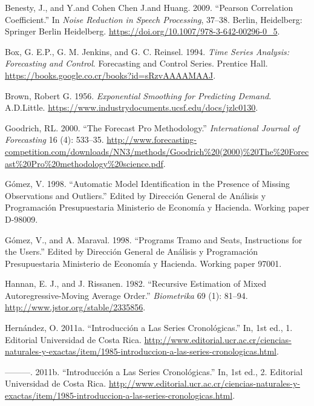 \documentclass[]{article}
\begin{document}
\leavevmode\hypertarget{ref-pearson}{}%
Benesty, J., and Y.and Cohen Chen J.and Huang. 2009. ``Pearson
Correlation Coefficient.'' In \emph{Noise Reduction in Speech
Processing}, 37--38. Berlin, Heidelberg: Springer Berlin Heidelberg.
\url{https://doi.org/10.1007/978-3-642-00296-0_5}.

\leavevmode\hypertarget{ref-box-jenkins}{}%
Box, G. E.P., G. M. Jenkins, and G. C. Reinsel. 1994. \emph{Time Series
Analysis: Forecasting and Control}. Forecasting and Control Series.
Prentice Hall. \url{https://books.google.co.cr/books?id=sRzvAAAAMAAJ}.

\leavevmode\hypertarget{ref-brown}{}%
Brown, Robert G. 1956. \emph{Exponential Smoothing for Predicting
Demand}. A.D.Little.
\url{https://www.industrydocuments.ucsf.edu/docs/jzlc0130}.

\leavevmode\hypertarget{ref-forecastpro}{}%
Goodrich, RL. 2000. ``The Forecast Pro Methodology.''
\emph{International Journal of Forecasting} 16 (4): 533--35.
\url{http://www.forecasting-competition.com/downloads/NN3/methods/Goodrich\%20(2000)\%20The\%20Forecast\%20Pro\%20methodology\%20science.pdf}.

\leavevmode\hypertarget{ref-gomez}{}%
Gómez, V. 1998. ``Automatic Model Identification in the Presence of
Missing Observations and Outliers.'' Edited by Dirección General de
Análisis y Programación Presupuestaria Ministerio de Economía y
Hacienda. Working paper D-98009.

\leavevmode\hypertarget{ref-tramo}{}%
Gómez, V., and A. Maraval. 1998. ``Programs Tramo and Seats,
Instructions for the Users.'' Edited by Dirección General de Análisis y
Programación Presupuestaria Ministerio de Economía y Hacienda. Working
paper 97001.

\leavevmode\hypertarget{ref-hannan}{}%
Hannan, E. J., and J. Rissanen. 1982. ``Recursive Estimation of Mixed
Autoregressive-Moving Average Order.'' \emph{Biometrika} 69 (1): 81--94.
\url{http://www.jstor.org/stable/2335856}.

\leavevmode\hypertarget{ref-oscarh-1}{}%
Hernández, O. 2011a. ``Introducción a Las Series Cronológicas.'' In, 1st
ed., 1. Editorial Universidad de Costa Rica.
\url{http://www.editorial.ucr.ac.cr/ciencias-naturales-y-exactas/item/1985-introduccion-a-las-series-cronologicas.html}.

\leavevmode\hypertarget{ref-oscarh-2}{}%
---------. 2011b. ``Introducción a Las Series Cronológicas.'' In, 1st
ed., 2. Editorial Universidad de Costa Rica.
\url{http://www.editorial.ucr.ac.cr/ciencias-naturales-y-exactas/item/1985-introduccion-a-las-series-cronologicas.html}.
\end{document}
